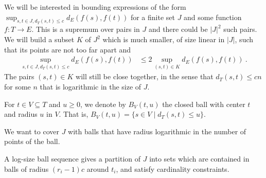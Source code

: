 We will be interested in bounding expressions of the form $\sup_{s,t\in J, d_T(s,t) \le c} d_E(f(s), f(t))$ for a finite set $J$ and some function $f : T \to E$.
This is a supremum over pairs in $J$ and there could be $\vert J \vert^2$ such pairs.
We will build a subset $K$ of $J^2$ which is much smaller, of size linear in $\vert J \vert$, such that its points are not too far apart and
\begin{align*}
  \sup_{s,t\in J, d_T(s,t) \le c} d_E(f(s), f(t))
  & \le 2 \sup_{(s,t) \in K} d_E(f(s), f(t))
  \: .
\end{align*}
The pairs $(s, t) \in K$ will still be close together, in the sense that $d_T(s, t) \le c n$ for some $n$ that is logarithmic in the size of $J$.

For $t \in V \subseteq T$ and $u\ge 0$, we denote by $B_V(t, u)$ the closed ball with center $t$ and radius $u$ in $V$.
That is, $B_V(t, u) = \{s \in V \mid d_T(s, t) \le u\}$.

We want to cover $J$ with balls that have radius logarithmic in the number of points of the ball.












A log-size ball sequence gives a partition of $J$ into sets which are contained in balls of radius $(r_i - 1)c$ around $t_i$, and satisfy cardinality constraints.




























